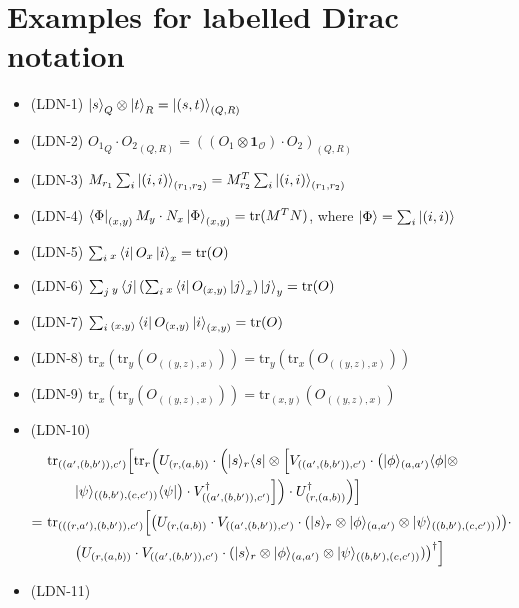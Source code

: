 \section{Examples for labelled Dirac notation}
\newcommand{\tr}{\mathrm{tr}}
\label{sec: examples for labelled}
\begin{itemize}
    \item (LDN-1) \( \ket{s}_Q \otimes \ket{t}_R = \ket{(s, t)}_{(Q, R)} \)
    \item (LDN-2) \( {O_1}_{Q} \cdot {O_2}_{(Q,R)} = ((O_1 \otimes \mathbf{1}_\mathcal{O}) \cdot O_2)_{(Q,R)} \)
    \item (LDN-3) \( M_{r_1} \sum_{i} \ket{(i, i)}_{(r_1, r_2)} = M^T_{r_2} \sum_{i}\ket{(i, i)}_{(r_1, r_2)} \)
    \item (LDN-4) \( \bra{\Phi}_{(x, y)} M_y \cdot N_x \ket{\Phi}_{(x, y)} = \mathrm{tr}(M^T N) \), where $\ket{\Phi} = \sum_{i} \ket{(i, i)}$
    \item (LDN-5) \( \sum_{i} {}_x\bra{i} O_x \ket{i}_x = \mathrm{tr}(O) \)
    \item (LDN-6) \( \sum_{j} {}_y\bra{j} (\sum_{i} {}_x\bra{i} O_{(x,y)} \ket{j}_x) \ket{j}_y = \mathrm{tr}(O) \)
    \item (LDN-7) \( \sum_{i} {}_{(x, y)}\bra{i} O_{(x,y)} \ket{i}_{(x, y)} = \mathrm{tr}(O) \)
    \item (LDN-8) \( \mathrm{tr}_x(\mathrm{tr}_y(O_{((y,z),x)})) = \mathrm{tr}_y(\mathrm{tr}_x(O_{((y,z),x)})) \)
    \item (LDN-9) \( \mathrm{tr}_x(\mathrm{tr}_y(O_{((y,z),x)})) = \mathrm{tr}_{(x, y)}(O_{((y,z),x)}) \)
    \item (LDN-10) \begin{align*}
        & \tr_{((a',(b,b')),c')}\Big[\tr_{r}\Big(U_{(r,(a,b))} \cdot\Big(|s\>_r\<s|\otimes 
        \Big[V_{((a',(b,b')),c')}\cdot 
        \big(|\phi\>_{(a,a')}\<\phi|\otimes \\
        &\qquad |\psi\>_{((b,b'),(c,c'))}\<\psi|\big)
        \cdot V^\dagger_{((a',(b,b')),c')}\Big]
        \Big) \cdot U^\dagger_{(r,(a,b))} \Big)\Big] \\
        =\ &\tr_{(((r,a'),(b,b')),c')}\Big[\big(U_{(r,(a,b))}\cdot V_{((a',(b,b')),c')}\cdot(|s\>_r\otimes |\phi\>_{(a,a')}\otimes |\psi\>_{((b,b'),(c,c'))})\big)\cdot \\
        &\qquad \big(U_{(r,(a,b))}\cdot V_{((a',(b,b')),c')}\cdot(|s\>_r\otimes |\phi\>_{(a,a')}\otimes |\psi\>_{((b,b'),(c,c'))})\big)^\dagger\Big]
    \end{align*}
    \item (LDN-11)    

\end{itemize}
